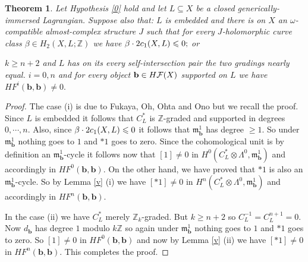 \documentclass{article}
\theoremstyle{plain}%
\newtheorem{thm}{Theorem}[section]
\theoremstyle{definition}
\numberwithin{equation}{section}
\numberwithin{figure}{section}
\def\iz#1\iz{\begin{itemize}#1\end{itemize}}
\def\l{\label}
\def\fm{\mathfrak m}
\def\ge{\geqslant}
\def\le{\leqslant\nobreak}
\def\cF{{\mathbin{\cal F}}}
\def\Z{{\mathbin{\mathbb Z}}}
\def\be{\beta}
\def\om{\omega}
\def\La{\Lambda}
\def\ot{\otimes}
\def\sb{\subseteq}
\def\b{{\mathbf{b}}}
\begin{document}
\begin{thm}\l{ne0}
Let Hypothesis \ref{0} hold and let $L\sb X$ be a closed generically-immersed Lagrangian.
Suppose also that:
\iz
\item[\bf(i)] $L$ is embedded and there is on $X$ an $\om$-compatible almost-complex structure $J$
such that for every $J$-holomorphic curve class $\be\in H_2(X,L;\Z)$
we have $\be\cdot2c_1(X,L)\le0;$ or
\item[\bf(ii)] $k\ge n+2$ and $L$ has on its every self-intersection pair the two gradings nearly equal.
\iz
Then for $i=0,n$ and for every object $\b\in H\cF(X)$ supported on $L$
we have $HF^i(\b,\b)\ne0.$
\end{thm}
\begin{proof}
The case (i) is due to Fukaya, Oh, Ohta and Ono \cite[Theorem E]{FOOO} but we recall the proof.
Since $L$ is embedded it follows that $C_L^*$ is $\Z$-graded
and supported in degrees $0,\cdots,n.$
Also, since $\be\cdot2c_1(X,L)\le0$ it follows that $\fm_\b^1$ has degree $\ge1.$
So under $\fm_\b^1$ nothing goes to $1$ and $*1$ goes to zero.
Since the cohomological unit is by definition an $\fm_\b^1$-cycle it follows now that $[1]\ne0$ in $H^0(C_L^*\ot\La^0,\fm_\b^1)$ and accordingly in $HF^0(\b,\b).$
On the other hand, we have proved that $*1$ is also an $\fm_\b^1$-cycle.
So by Lemma \ref{v} (i) we have $[*1]\ne0$ in 
$H^n(C_L^*\ot\La^0,\fm_\b^1)$ and accordingly in $HF^n(\b,\b).$

In the case (ii) we have $C_L^*$ merely $\Z_k$-graded.
But $k\ge n+2$ so $C_L^{-1}=C_L^{n+1}=0.$
Now $d_\b$ has degree $1$ modulo $k\Z$ so again
under $\fm_\b^1$ nothing goes to $1$
and $*1$ goes to zero.
So $[1]\ne0$ in $HF^0(\b,\b)$ and now by Lemma \ref{v} (ii) we have
$[*1]\ne0$ in $HF^n(\b,\b).$
This completes the proof.
\end{proof}
\end{document}
